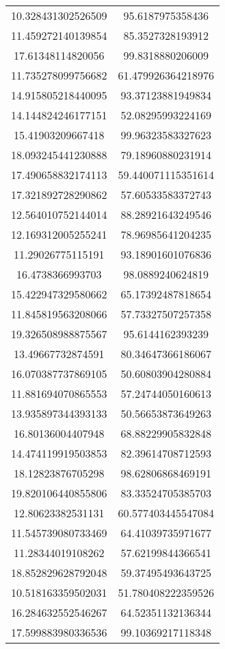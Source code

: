 \begin{table}
\begin{tabular}{cc}
10.328431302526509 & 95.6187975358436 \\
11.459272140139854 & 85.3527328193912 \\
17.61348114820056 & 99.8318880206009 \\
11.735278099756682 & 61.479926364218976 \\
14.915805218440095 & 93.37123881949834 \\
14.144824246177151 & 52.08295993224169 \\
15.41903209667418 & 99.96323583327623 \\
18.093245441230888 & 79.18960880231914 \\
17.490658832174113 & 59.440071115351614 \\
17.321892728290862 & 57.60533583372743 \\
12.564010752144014 & 88.28921643249546 \\
12.169312005255241 & 78.96985641204235 \\
11.29026775115191 & 93.18901601076836 \\
16.4738366993703 & 98.0889240624819 \\
15.422947329580662 & 65.17392487818654 \\
11.845819563208066 & 57.73327507257358 \\
19.326508988875567 & 95.6144162393239 \\
13.49667732874591 & 80.34647366186067 \\
16.070387737869105 & 50.60803904280884 \\
11.881694070865553 & 57.24744050160613 \\
13.935897344393133 & 50.56653873649263 \\
16.80136004407948 & 68.88229905832848 \\
14.474119919503853 & 82.39614708712593 \\
18.12823876705298 & 98.62806868469191 \\
19.820106440855806 & 83.33524705385703 \\
12.80623382531131 & 60.577403445547084 \\
11.545739080733469 & 64.41039735971677 \\
11.28344019108262 & 57.62199844366541 \\
18.852829628792048 & 59.37495493643725 \\
10.518163359502031 & 51.780408222359526 \\
16.284632552546267 & 64.52351132136344 \\
17.599883980336536 & 99.10369217118348 \\

\end{tabular}
\end{table}
